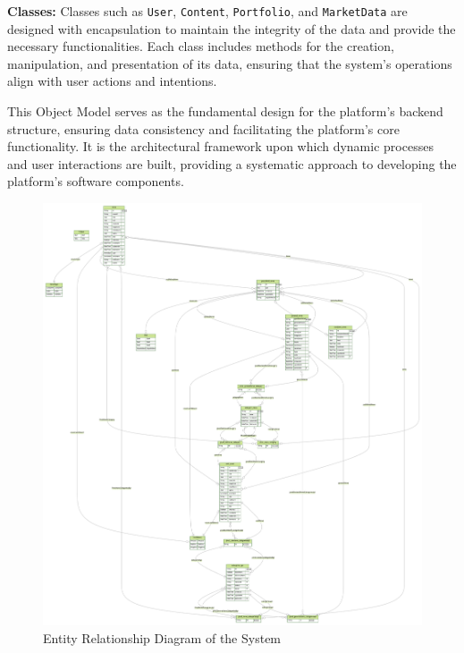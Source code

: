 \documentclass[12pt]{report}
\begin{document}
\textbf{Classes:}
Classes such as \texttt{User}, \texttt{Content}, \texttt{Portfolio}, and \texttt{MarketData} are designed with encapsulation to maintain the integrity of the data and provide the necessary functionalities. Each class includes methods for the creation, manipulation, and presentation of its data, ensuring that the system's operations align with user actions and intentions.

This Object Model serves as the fundamental design for the platform's backend structure, ensuring data consistency and facilitating the platform's core functionality. It is the architectural framework upon which dynamic processes and user interactions are built, providing a systematic approach to developing the platform's software components.
\clearpage %
\begin{figure}[p] %
\centering %
\includegraphics[width=\textwidth,height=\textheight,keepaspectratio]{ERD.png} %
\caption{Entity Relationship Diagram of the System} %
\label{fig:er_diagram} %
\end{figure}
\clearpage %
\end{document}

